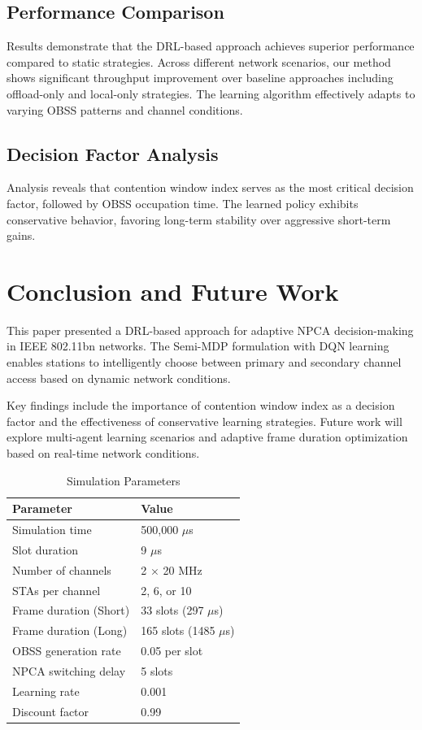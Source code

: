 \documentclass[conference]{IEEEtran}
\begin{document}
\subsection{Performance Comparison}

Results demonstrate that the DRL-based approach achieves superior performance compared to static strategies. Across different network scenarios, our method shows significant throughput improvement over baseline approaches including offload-only and local-only strategies. The learning algorithm effectively adapts to varying OBSS patterns and channel conditions.

\subsection{Decision Factor Analysis}

Analysis reveals that contention window index serves as the most critical decision factor, followed by OBSS occupation time. The learned policy exhibits conservative behavior, favoring long-term stability over aggressive short-term gains.

\section{Conclusion and Future Work}

This paper presented a DRL-based approach for adaptive NPCA decision-making in IEEE 802.11bn networks. The Semi-MDP formulation with DQN learning enables stations to intelligently choose between primary and secondary channel access based on dynamic network conditions.

Key findings include the importance of contention window index as a decision factor and the effectiveness of conservative learning strategies. Future work will explore multi-agent learning scenarios and adaptive frame duration optimization based on real-time network conditions.

\begin{table}[htbp]
\caption{Simulation Parameters}
\begin{center}
\begin{tabular}{|l|l|}
\hline
\textbf{Parameter} & \textbf{Value} \\
\hline
Simulation time & 500,000 $\mu$s \\
Slot duration & 9 $\mu$s \\
Number of channels & 2 $\times$ 20 MHz \\
STAs per channel & 2, 6, or 10 \\
Frame duration (Short) & 33 slots (297 $\mu$s) \\
Frame duration (Long) & 165 slots (1485 $\mu$s) \\
OBSS generation rate & 0.05 per slot \\
NPCA switching delay & 5 slots \\
Learning rate & 0.001 \\
Discount factor & 0.99 \\
\hline
\end{tabular}
\label{tab:params}
\end{center}
\end{table}
\end{document}
